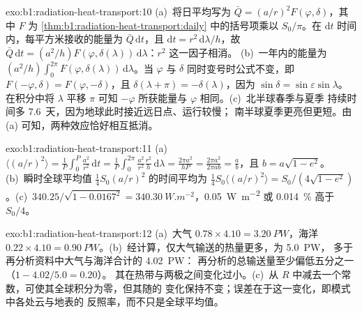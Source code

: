 \begin{solution}{exo:b1:radiation-heat-transport:10}
(a)~将日平均写为 $\bar Q = (a/r)^2 F(\varphi, \delta)$，其中 $F$ 为
\cref{thm:b1:radiation-heat-transport:daily} 中的括号项乘以 $S_0/\pi$。在
$\mathrm dt$ 时间内，每平方米接收的能量为 $\bar Q\,\mathrm dt$，且
$\mathrm dt = r^2\,\mathrm d\lambda/h$，故 $\bar Q\,\mathrm dt = (a^2/h)
F(\varphi, \delta(\lambda))\,\mathrm d\lambda$：$r^2$ 这一因子相消。
(b)~一年内的能量为 $(a^2/h)\int_0^{2\pi} F(\varphi,
\delta(\lambda))\,\mathrm d\lambda$。当 $\varphi$ 与
$\delta$ 同时变号时公式不变，即 $F(-\varphi, \delta) = F(\varphi, -\delta)$，且
$\delta(\lambda + \pi) = -\delta(\lambda)$，因为 $\sin\delta = \sin\varepsilon
\sin\lambda$。在积分中将 $\lambda$ 平移 $\pi$ 可知 $-\varphi$
所获能量与 $\varphi$ 相同。(c)~北半球春季与夏季
持续时间多 \num{7.6}~天，因为地球此时接近远日点、运行较慢；
南半球夏季更亮但更短。由 (a) 可知，两种效应恰好相互抵消。
\end{solution}

\begin{solution}{exo:b1:radiation-heat-transport:11}
(a)~$\langle (a/r)^2\rangle = \frac1P\int_0^P \frac{a^2}{r^2}\,\mathrm dt =
\frac1P\int_0^{2\pi}\frac{a^2}{r^2}\frac{r^2}{h}\,\mathrm d\lambda = \frac{2\pi
a^2}{hP} = \frac{2\pi a^2}{2\pi a b} = \frac ab$，且 $b = a\sqrt{1-e^2}$。
(b)~瞬时全球平均值 $\frac14 S_0(a/r)^2$ 的时间平均为 $\frac14 S_0
\langle(a/r)^2\rangle = S_0/(4\sqrt{1-e^2})$。(c)~$340.25/\sqrt{1 - 0.0167^2} =
\qty{340.30}{W.m^{-2}}$，\qty{0.05}{W.m^{-2}} 或 \qty{0.014}{\percent} 高于
$S_0/4$。
\end{solution}

\begin{solution}{exo:b1:radiation-heat-transport:12}
(a)~大气 $0.78 \times 4.10 = \qty{3.20}{PW}$，海洋 $0.22 \times 4.10 =
\qty{0.90}{PW}$。(b)~经计算，仅大气输送的热量更多，为 \qty{5.0}{PW}，
多于再分析资料中大气与海洋合计的 \qty{4.02}{PW}：
再分析的总输送量至少偏低五分之一（$1 - 4.02/5.0 = 0.20$）。
其在热带与两极之间变化过小。(c)~从
$R$ 中减去一个常数，可使其全球积分为零，但其随的
变化保持不变；误差在于这一变化，即模式中各处云与地表的
反照率，而不只是全球平均值。
\end{solution}

